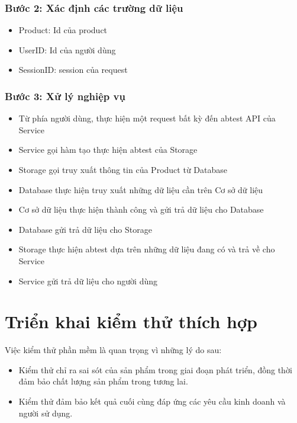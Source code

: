 \subsubsection{Bước 2: Xác định các trường dữ liệu}

\begin{itemize}
	\item Product: Id của product
	\item UserID: Id của người dùng
	\item SessionID: session của request
\end{itemize}

\subsubsection{Bước 3: Xử lý nghiệp vụ}

\begin{itemize}
	\item Từ phía người dùng, thực hiện một request bất kỳ đến abtest API của Service
	\item Service gọi hàm tạo thực hiện abtest của Storage
	\item Storage gọi truy xuất thông tin của Product từ Database
	\item Database thực hiện truy xuất những dữ liệu cần trên Cơ sở dữ liệu
	\item Cơ sở dữ liệu thực hiện thành công và gửi trả dữ liệu cho Database
	\item Database gửi trả dữ liệu cho Storage
	\item Storage thực hiện abtest dựa trên những dữ liệu đang có và trả về cho Service
	\item Service gửi trả dữ liệu cho người dùng
\end{itemize}

\section{Triển khai kiểm thử thích hợp}

Việc kiểm thử phần mềm là quan trọng vì những lý do sau:

\begin{itemize}
	\item Kiểm thử chỉ ra sai sót của sản phẩm trong giai đoạn phát triển, đồng thời đảm bảo chất lượng sản phẩm trong tương lai.
	\item Kiểm thử đảm bảo kết quả cuối cùng đáp ứng các yêu cầu kinh doanh và người sử dụng.
\end{itemize}

